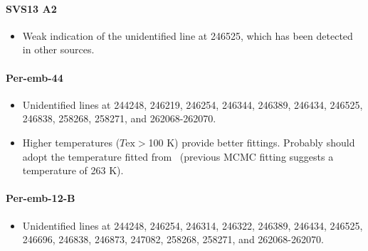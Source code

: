 
\paragraph{SVS13 A2}
\begin{itemize}
  \item Weak indication of the unidentified line at 246525\mhz, which has been detected in other sources.
\end{itemize}

\paragraph{Per-emb-44}
\begin{itemize}
  \item Unidentified lines at 244248\mhz, 246219\mhz, 246254\mhz, 246344\mhz, 246389\mhz, 246434\mhz, 246525\mhz, 246838\mhz, 258268\mhz, 258271\mhz, and 262068-262070\mhz.
  \item Higher temperatures ($T\text{ex} > $100 K) provide better fittings.  Probably should adopt the temperature fitted from \methylformate\ (previous MCMC fitting suggests a temperature of 263 K).
\end{itemize}

\paragraph{Per-emb-12-B}
\begin{itemize}
  \item Unidentified lines at 244248\mhz, 246254\mhz, 246314\mhz, 246322\mhz, 246389\mhz, 246434\mhz, 246525\mhz, 246696\mhz, 246838\mhz, 246873\mhz, 247082\mhz, 258268\mhz, 258271\mhz, and 262068-262070\mhz.
\end{itemize}

